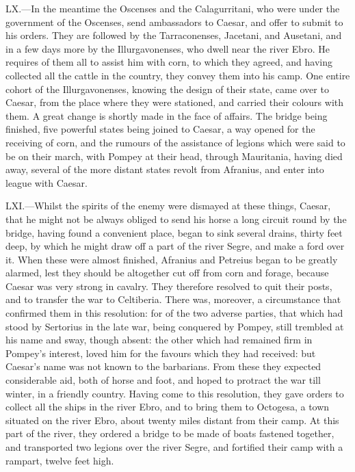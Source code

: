 LX.—In the meantime the Oscenses and the Calagurritani, who were under
the government of the Oscenses, send ambassadors to Caesar, and offer to
submit to his orders. They are followed by the Tarraconenses, Jacetani,
and Ausetani, and in a few days more by the Illurgavonenses, who dwell
near the river Ebro. He requires of them all to assist him with corn, to
which they agreed, and having collected all the cattle in the country,
they convey them into his camp. One entire cohort of the
Illurgavonenses, knowing the design of their state, came over to Caesar,
from the place where they were stationed, and carried their colours with
them. A great change is shortly made in the face of affairs. The bridge
being finished, five powerful states being joined to Caesar, a way
opened for the receiving of corn, and the rumours of the assistance of
legions which were said to be on their march, with Pompey at their head,
through Mauritania, having died away, several of the more distant states
revolt from Afranius, and enter into league with Caesar.

LXI.—Whilst the spirits of the enemy were dismayed at these things,
Caesar, that he might not be always obliged to send his horse a long
circuit round by the bridge, having found a convenient place, began to
sink several drains, thirty feet deep, by which he might draw off a part
of the river Segre, and make a ford over it. When these were almost
finished, Afranius and Petreius began to be greatly alarmed, lest they
should be altogether cut off from corn and forage, because Caesar was
very strong in cavalry. They therefore resolved to quit their posts, and
to transfer the war to Celtiberia. There was, moreover, a circumstance
that confirmed them in this resolution: for of the two adverse parties,
that which had stood by Sertorius in the late war, being conquered by
Pompey, still trembled at his name and sway, though absent: the other
which had remained firm in Pompey's interest, loved him for the favours
which they had received: but Caesar's name was not known to the
barbarians. From these they expected considerable aid, both of horse and
foot, and hoped to protract the war till winter, in a friendly country.
Having come to this resolution, they gave orders to collect all the
ships in the river Ebro, and to bring them to Octogesa, a town situated
on the river Ebro, about twenty miles distant from their camp. At this
part of the river, they ordered a bridge to be made of boats fastened
together, and transported two legions over the river Segre, and
fortified their camp with a rampart, twelve feet high.

